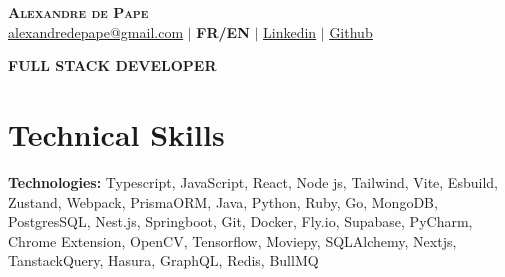 \documentclass[letterpaper,11pt]{article}
\begin{document}

\begin{center}
  \textbf{\Huge \scshape Alexandre de Pape} \\ \vspace{1pt}
  \href{mailto:alexandredepape@gmail.com}{\underline{alexandredepape@gmail.com}}
  $|$
  \textbf{FR/EN}
  $|$
  \href{https://www.linkedin.com/in/alexandre-de-pape-6869541b1/}{\underline{Linkedin}} $|$
  \href{https://alexandredepape.github.io/}{\underline{Github}}
\end{center}

\centering
\textbf{FULL STACK DEVELOPER}

\section{Technical Skills}
\begin{itemize}[leftmargin=0.15in, label={}]
  \small{\item{
    \textbf{Technologies: }{Typescript, JavaScript, React, Node js, Tailwind, Vite, Esbuild, Zustand, Webpack, PrismaORM, Java, Python, Ruby, Go, MongoDB, PostgresSQL, Nest.js, Springboot, Git, Docker, Fly.io, Supabase, PyCharm, Chrome Extension, OpenCV, Tensorflow, Moviepy, SQLAlchemy, Nextjs, TanstackQuery, Hasura, GraphQL, Redis, BullMQ}
  }}
\end{itemize}

\def\linkColor{Mulberry}
\end{document}
